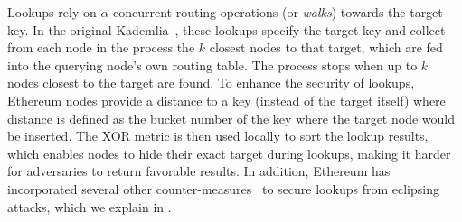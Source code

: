 Lookups rely on $\alpha$ concurrent routing operations (or \emph{walks}) towards the target key.
In the original Kademlia~\cite{maymounkov2002kademlia}, these lookups specify the target key and collect from each node in the process the $k$ closest nodes to that target, which are fed into the querying node's own routing table.
The process stops when up to $k$ nodes closest to the target are found. %
To enhance the security of lookups,  Ethereum nodes provide a distance to a key (instead of the target itself) where distance is defined as the bucket number of the key where 
the target node would be inserted. The XOR metric is then used locally to sort the lookup results, which enables nodes to hide their exact target during lookups, making it harder for adversaries to return favorable results. 
In addition, Ethereum has incorporated several other counter-measures~\cite{marcus2018low, henningsen2019eclipsing} to secure lookups from eclipsing attacks, which we explain in .








